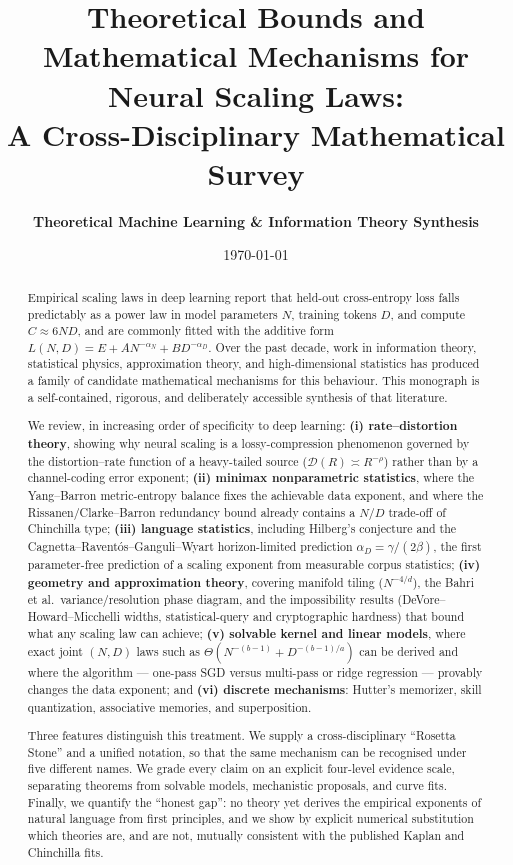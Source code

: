 \documentclass[11pt,a4paper]{article}
\title{\textbf{\Large Theoretical Bounds and Mathematical Mechanisms for Neural Scaling Laws:\\A Cross-Disciplinary Mathematical Survey}}
\author{\textbf{Theoretical Machine Learning \& Information Theory Synthesis}}
\date{\today}
\theoremstyle{definition}
\begin{document}
\setlength{\emergencystretch}{2em}
\maketitle

\begin{abstract}
Empirical scaling laws in deep learning report that held-out cross-entropy loss falls predictably as a power law in model parameters $N$, training tokens $D$, and compute $C \approx 6ND$, and are commonly fitted with the additive form $L(N,D) = E + A N^{-\alpha_N} + B D^{-\alpha_D}$. Over the past decade, work in information theory, statistical physics, approximation theory, and high-dimensional statistics has produced a family of candidate mathematical mechanisms for this behaviour. This monograph is a self-contained, rigorous, and deliberately accessible synthesis of that literature.

We review, in increasing order of specificity to deep learning: \textbf{(i) rate--distortion theory}, showing why neural scaling is a lossy-compression phenomenon governed by the distortion--rate function of a heavy-tailed source ($\mathcal{D}(R) \asymp R^{-\rho}$) rather than by a channel-coding error exponent; \textbf{(ii) minimax nonparametric statistics}, where the Yang--Barron metric-entropy balance fixes the achievable data exponent, and where the Rissanen/Clarke--Barron redundancy bound already contains a $N/D$ trade-off of Chinchilla type; \textbf{(iii) language statistics}, including Hilberg's conjecture and the Cagnetta--Ravent\'os--Ganguli--Wyart horizon-limited prediction $\alpha_D = \gamma/(2\beta)$, the first parameter-free prediction of a scaling exponent from measurable corpus statistics; \textbf{(iv) geometry and approximation theory}, covering manifold tiling ($N^{-4/d}$), the Bahri et al.\ variance/resolution phase diagram, and the impossibility results (DeVore--Howard--Micchelli widths, statistical-query and cryptographic hardness) that bound what any scaling law can achieve; \textbf{(v) solvable kernel and linear models}, where exact joint $(N,D)$ laws such as $\Theta(N^{-(b-1)} + D^{-(b-1)/a})$ can be derived and where the algorithm --- one-pass SGD versus multi-pass or ridge regression --- provably changes the data exponent; and \textbf{(vi) discrete mechanisms}: Hutter's memorizer, skill quantization, associative memories, and superposition.

Three features distinguish this treatment. We supply a cross-disciplinary ``Rosetta Stone'' and a unified notation, so that the same mechanism can be recognised under five different names. We grade every claim on an explicit four-level evidence scale, separating theorems from solvable models, mechanistic proposals, and curve fits. Finally, we quantify the ``honest gap'': no theory yet derives the empirical exponents of natural language from first principles, and we show by explicit numerical substitution which theories are, and are not, mutually consistent with the published Kaplan and Chinchilla fits.
\end{abstract}
\end{document}
